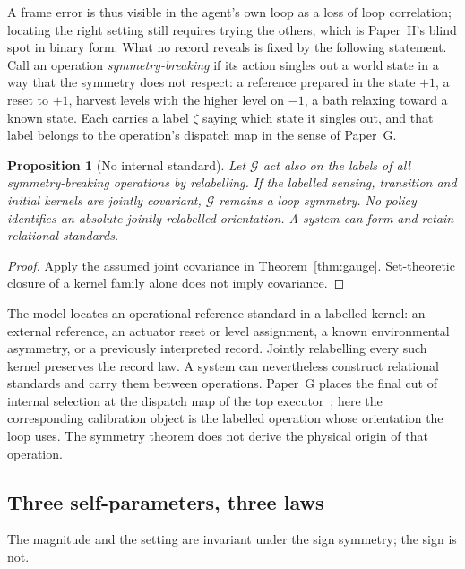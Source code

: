 \documentclass[12pt]{article}
\newtheorem{proposition}[theorem]{Proposition}
\theoremstyle{definition}
\begin{document}
A frame error is thus visible in the agent's own loop as a loss of loop correlation; locating the right setting still requires trying the others, which is Paper~II's blind spot in binary form. What no record reveals is fixed by the following statement. Call an operation \emph{symmetry-breaking} if its action singles out a world state in a way that the symmetry does not respect: a reference prepared in the state $+1$, a reset to $+1$, harvest levels with the higher level on $-1$, a bath relaxing toward a known state. Each carries a label $\zeta$ saying which state it singles out, and that label belongs to the operation's dispatch map in the sense of Paper~G.

\begin{proposition}[No internal standard]
\label{prop:nostandard}
Let $\mathcal G$ act also on the labels of all symmetry-breaking operations by relabelling. If the labelled sensing, transition and initial kernels are jointly covariant, $\mathcal G$ remains a loop symmetry. No policy identifies an absolute jointly relabelled orientation. A system can form and retain relational standards.
\end{proposition}

\begin{proof}
Apply the assumed joint covariance in Theorem~\ref{thm:gauge}. Set-theoretic closure of a kernel family alone does not imply covariance.
\end{proof}

The model locates an operational reference standard in a labelled kernel: an external reference, an actuator reset or level assignment, a known environmental asymmetry, or a previously interpreted record. Jointly relabelling every such kernel preserves the record law. A system can nevertheless construct relational standards and carry them between operations. Paper~G places the final cut of internal selection at the dispatch map of the top executor~\cite{Liu2026HAFF_G}; here the corresponding calibration object is the labelled operation whose orientation the loop uses. The symmetry theorem does not derive the physical origin of that operation.

\subsection{Three self-parameters, three laws}
\label{subsec:J_laws}

The magnitude and the setting are invariant under the sign symmetry; the sign is not.
\end{document}
